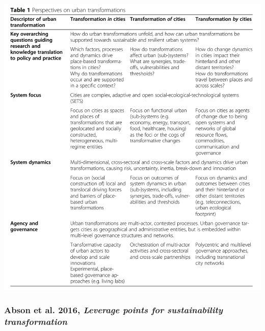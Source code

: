 \documentclass{article}
\begin{document}
\includegraphics[width=\textwidth]{perspectives_urban_transformations}

\subsubsection{Abson et al. 2016, \textit{Leverage points for sustainability transformation}}
\end{document}
